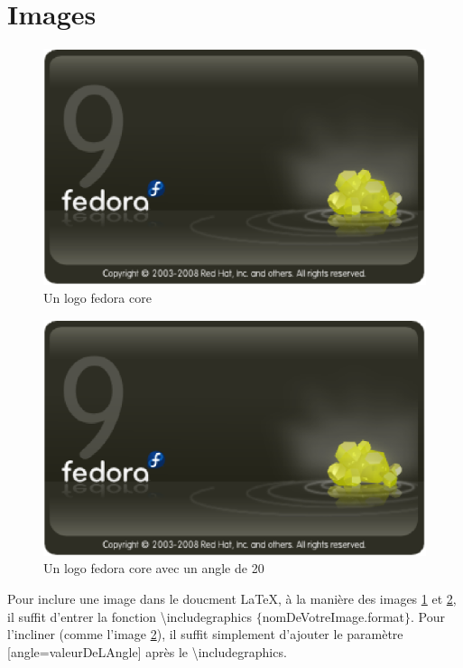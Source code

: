 \documentclass[a4paper, french, 8pt]{report}
\begin{document}
\section{Images}
\label{section2}
\begin{figure}[!h]
    \centering
    \includegraphics[scale=0.3]{fedora.eps}
    \caption{Un logo fedora core}
    \label{logo_fedora_droit}
\end{figure}

\begin{figure}[!h]
    \centering
    \includegraphics[scale=0.3, angle=20]{fedora.eps}
    \caption{Un logo fedora core avec un angle de 20\degre}
    \label{logo_fedora_incline}
\end{figure}


 Pour inclure une image dans le doucment \LaTeX, à la manière des images \ref{logo_fedora_droit} et \ref{logo_fedora_incline}, il suffit d'entrer la fonction \textbackslash includegraphics $\{$nomDeVotreImage.format$\}$. Pour l'incliner (comme l'image \ref{logo_fedora_incline}), il suffit simplement d'ajouter le paramètre [angle=valeurDeLAngle] après le \textbackslash includegraphics.
\end{document}
